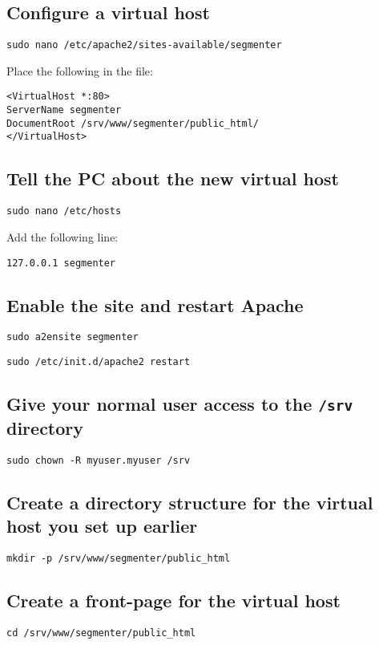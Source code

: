 \documentclass[a4paper,10pt]{article}
\begin{document}
\subsection{Configure a virtual host}

\texttt{sudo nano /etc/apache2/sites-available/segmenter}

Place the following in the file:

\begin{verbatim}
<VirtualHost *:80>
ServerName segmenter
DocumentRoot /srv/www/segmenter/public_html/
</VirtualHost>
\end{verbatim}

\subsection{Tell the PC about the new virtual host}

\texttt{sudo nano /etc/hosts}

Add the following line:

\texttt{127.0.0.1	segmenter}

\subsection{Enable the site and restart Apache}

\texttt{sudo a2ensite segmenter}

\texttt{sudo /etc/init.d/apache2 restart}

\subsection{Give your normal user access to the \texttt{/srv} directory}

\texttt{sudo chown -R myuser.myuser /srv}

\subsection{Create a directory structure for the virtual host you set up earlier}

\texttt{mkdir -p /srv/www/segmenter/public\_html}

\subsection{Create a front-page for the virtual host}

\texttt{cd /srv/www/segmenter/public\_html}
\end{document}
